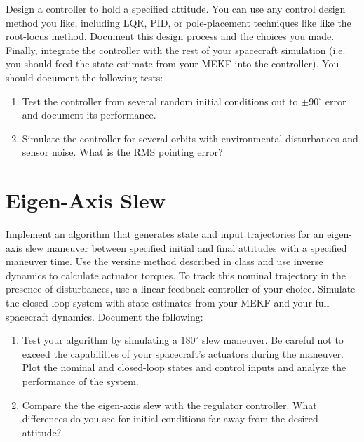 \documentclass[11pt,letterpaper]{article}
\begin{document}
Design a controller to hold a specified attitude. You can use any control design method you like, including LQR, PID, or pole-placement techniques like like the root-locus method. Document this design process and the choices you made. Finally, integrate the controller with the rest of your spacecraft simulation (i.e. you should feed the state estimate from your MEKF into the controller). You should document the following tests:
\begin{enumerate}
	\item Test the controller from several random initial conditions out to $\pm 90^\circ$ error and document its performance.
	\item Simulate the controller for several orbits with environmental disturbances and sensor noise. What is the RMS pointing error?
\end{enumerate}

\section{Eigen-Axis Slew}

Implement an algorithm that generates state and input trajectories for an eigen-axis slew maneuver between specified initial and final attitudes with a specified maneuver time. Use the versine method described in class and use inverse dynamics to calculate actuator torques. To track this nominal trajectory in the presence of disturbances, use a linear feedback controller of your choice. Simulate the closed-loop system with state estimates from your MEKF and your full spacecraft dynamics. Document the following:
\begin{enumerate}
	\item Test your algorithm by simulating a $180^\circ$ slew maneuver. Be careful not to exceed the capabilities of your spacecraft's actuators during the maneuver. Plot the nominal and closed-loop states and control inputs and analyze the performance of the system.
	\item Compare the the eigen-axis slew with the regulator controller. What differences do you see for initial conditions far away from the desired attitude?
\end{enumerate}
\end{document}
